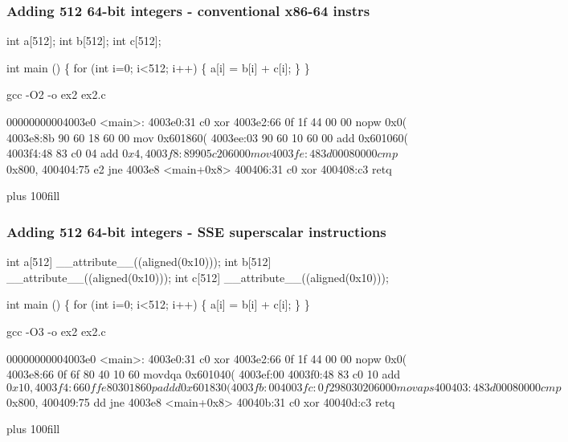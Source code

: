 \documentclass{beamer}
\begin{document}
\begin{frame}[fragile]
\frametitle{Adding 512 64-bit integers - conventional x86-64 instrs}
\begin{semiverbatim}
\tiny
int a[512];
int b[512];
int c[512];

int main () \{
  for (int i=0; i<512; i++) \{
    a[i] = b[i] + c[i];
  \}
\}

gcc -O2 -o ex2 ex2.c

00000000004003e0 <main>:
4003e0:31 c0                xor    %
4003e2:66 0f 1f 44 00 00    nopw   0x0(%
4003e8:8b 90 60 18 60 00    mov    0x601860(%
4003ee:03 90 60 10 60 00    add    0x601060(%
4003f4:48 83 c0 04          add    $0x4,%
4003f8:89 90 5c 20 60 00    mov    %
4003fe:48 3d 00 08 00 00    cmp    $0x800,%
400404:75 e2                jne    4003e8 <main+0x8>
400406:31 c0                xor    %
400408:c3                   retq   

\end{semiverbatim}
\vskip 0pt plus 100fill
\end{frame}

\begin{frame}[fragile]
\frametitle{Adding 512 64-bit integers - SSE superscalar instructions}
\begin{semiverbatim}
\tiny
int a[512] __attribute__((aligned(0x10)));
int b[512] __attribute__((aligned(0x10)));
int c[512] __attribute__((aligned(0x10)));

int main () \{
  for (int i=0; i<512; i++) \{
    a[i] = b[i] + c[i];
  \}
\}

gcc -O3 -o ex2 ex2.c

00000000004003e0 <main>:
4003e0:31 c0                xor    %
4003e2:66 0f 1f 44 00 00    nopw   0x0(%
4003e8:66 0f 6f 80 40 10 60 movdqa 0x601040(%
4003ef:00 
4003f0:48 83 c0 10          add    $0x10,%
4003f4:66 0f fe 80 30 18 60 paddd  0x601830(%
4003fb:00 
4003fc:0f 29 80 30 20 60 00 movaps %
400403:48 3d 00 08 00 00    cmp    $0x800,%
400409:75 dd                jne    4003e8 <main+0x8>
40040b:31 c0                xor    %
40040d:c3                   retq   

\end{semiverbatim}
\vskip 0pt plus 100fill
\end{frame}
\end{document}
